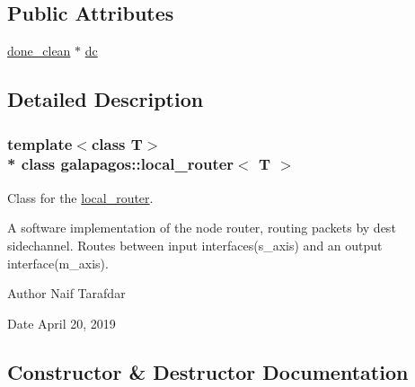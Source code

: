 \subsection*{Public Attributes}
\begin{DoxyCompactItemize}
\item 
\hyperlink{classgalapagos_1_1done__clean}{done\+\_\+clean} $\ast$ \hyperlink{classgalapagos_1_1local__router_abb93f7c129e675e8d10bc6a0989a7aba}{dc}
\end{DoxyCompactItemize}


\subsection{Detailed Description}
\subsubsection*{template$<$class T$>$\\*
class galapagos\+::local\+\_\+router$<$ T $>$}

Class for the \hyperlink{classgalapagos_1_1local__router}{local\+\_\+router}. 

A software implementation of the node router, routing packets by dest sidechannel. Routes between input interfaces(s\+\_\+axis) and an output interface(m\+\_\+axis). \begin{DoxyAuthor}{Author}
Naif Tarafdar 
\end{DoxyAuthor}
\begin{DoxyDate}{Date}
April 20, 2019 
\end{DoxyDate}


\subsection{Constructor \& Destructor Documentation}
